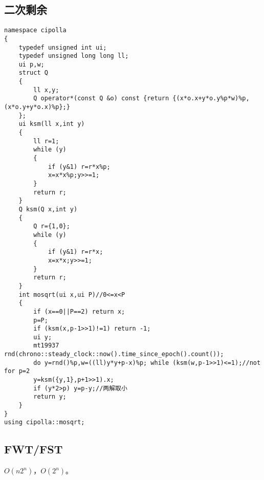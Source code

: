 \documentclass{ctexart}
\begin{document}
\subsection{二次剩余}

\begin{lstlisting}
namespace cipolla
{
	typedef unsigned int ui;
	typedef unsigned long long ll;
	ui p,w;
	struct Q
	{
		ll x,y;
		Q operator*(const Q &o) const {return {(x*o.x+y*o.y%p*w)%p,(x*o.y+y*o.x)%p};}
	};
	ui ksm(ll x,int y)
	{
		ll r=1;
		while (y)
		{
			if (y&1) r=r*x%p;
			x=x*x%p;y>>=1;
		}
		return r;
	}
	Q ksm(Q x,int y)
	{
		Q r={1,0};
		while (y)
		{
			if (y&1) r=r*x;
			x=x*x;y>>=1;
		}
		return r;
	}
	int mosqrt(ui x,ui P)//0<=x<P
	{
		if (x==0||P==2) return x;
		p=P;
		if (ksm(x,p-1>>1)!=1) return -1;
		ui y;
		mt19937 rnd(chrono::steady_clock::now().time_since_epoch().count());
		do y=rnd()%p,w=((ll)y*y+p-x)%p; while (ksm(w,p-1>>1)<=1);//not for p=2
		y=ksm({y,1},p+1>>1).x;
		if (y*2>p) y=p-y;//两解取小
		return y;
	}
}
using cipolla::mosqrt;
\end{lstlisting}

\subsection{FWT/FST}

$O(n2^n)$，$O(2^n)$。
\end{document}
